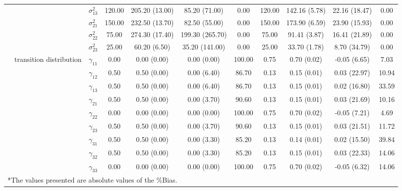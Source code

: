 \begin{table}[h]
{\begin{tabular}{ccccccccccc}
 &  & $\sigma^2_{13}$ & 120.00 & 205.20 (13.00) & 85.20 (71.00) & 0.00 & 120.00 & 142.16 (5.78) & 22.16 (18.47) & 0.00 \\
 &  & $\sigma^2_{21}$ & 150.00 & 232.50 (13.70) & 82.50 (55.00) & 0.00 & 150.00 & 173.90 (6.59) & 23.90 (15.93) & 0.00 \\
 &  & $\sigma^2_{22}$ & 75.00 & 274.30 (17.40) & 199.30 (265.70) & 0.00 & 75.00 & 91.41 (3.87) & 16.41 (21.89) & 0.00 \\
 &  & $\sigma^2_{23}$ & 25.00 & 60.20 (6.50) & 35.20 (141.00) & 0.00 & 25.00 & 33.70 (1.78) & 8.70 (34.79) & 0.00 \\
 & transition distribution & $\gamma_{11}$ & 0.00 & 0.00 (0.00) & 0.00 (0.00) & 100.00 & 0.75 & 0.70 (0.02) & -0.05 (6.65) & 7.03 \\
 & \multirow{8}{*}{} & $\gamma_{12}$ & 0.50 & 0.50 (0.00) & 0.00 (6.40) & 86.70 & 0.13 & 0.15 (0.01) & 0.03 (22.97) & 10.94 \\
 &  & $\gamma_{13}$ & 0.50 & 0.50 (0.00) & 0.00 (6.40) & 86.70 & 0.13 & 0.15 (0.01) & 0.02 (16.80) & 33.59 \\
 &  & $\gamma_{21}$ & 0.50 & 0.50 (0.00) & 0.00 (3.70) & 90.60 & 0.13 & 0.15 (0.01) & 0.03 (21.69) & 10.16 \\
 &  & $\gamma_{22}$ & 0.00 & 0.00 (0.00) & 0.00 (0.00) & 100.00 & 0.75 & 0.70 (0.02) & -0.05 (7.21) & 4.69 \\
 &  & $\gamma_{23}$ & 0.50 & 0.50 (0.00) & 0.00 (3.70) & 90.60 & 0.13 & 0.15 (0.01) & 0.03 (21.51) & 11.72 \\
 &  & $\gamma_{31}$ & 0.50 & 0.50 (0.00) & 0.00 (3.30) & 85.20 & 0.13 & 0.14 (0.01) & 0.02 (15.50) & 39.84 \\
 &  & $\gamma_{32}$ & 0.50 & 0.50 (0.00) & 0.00 (3.30) & 85.20 & 0.13 & 0.15 (0.01) & 0.03 (22.33) & 14.06 \\
 &  & $\gamma_{33}$ & 0.00 & 0.00 (0.00) & 0.00 (0.00) & 100.00 & 0.75 & 0.70 (0.02) & -0.05 (6.32) & 14.06 \\

\bottomrule
\multicolumn{10}{l}{*The values presented are absolute values of the \%Bias.}
\end{tabular}}
\label{tgr2_2}
\end{table}



